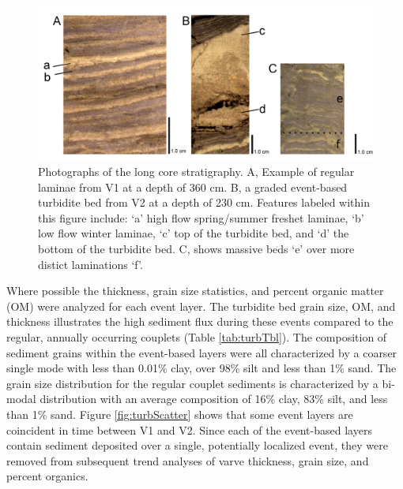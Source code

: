 \documentclass[Royal,times,doublespace,sageh]{sagej}
\begin{document}
\begin{figure}

{\centering \includegraphics[width=1\linewidth]{figs/good_vs_flood_vs_disturbed_varves_} 

}

\caption{Photographs of the long core stratigraphy. A, Example of regular laminae from V1 at a depth of 360 cm. B, a graded event-based turbidite bed from V2 at a depth of 230 cm. Features labeled within this figure include: ‘a’ high flow spring/summer freshet laminae, ‘b’ low flow winter laminae, ‘c’  top of the turbidite bed, and ‘d’ the bottom of the turbidite bed. C, shows massive beds ‘e’ over more distict laminations ‘f’.\label{tab:varve-turb}}\label{fig:varve-turb}
\end{figure}

Where possible the thickness, grain size statistics, and percent organic
matter (OM) were analyzed for each event layer. The turbidite bed grain
size, OM, and thickness illustrates the high sediment flux during these
events compared to the regular, annually occurring couplets (Table
\ref{tab:turbTbl}). The composition of sediment grains within the
event-based layers were all characterized by a coarser single mode with
less than 0.01\% clay, over 98\% silt and less than 1\% sand. The grain
size distribution for the regular couplet sediments is characterized by
a bi-modal distribution with an average composition of 16\% clay, 83\%
silt, and less than 1\% sand. Figure \ref{fig:turbScatter} shows that
some event layers are coincident in time between V1 and V2. Since each
of the event-based layers contain sediment deposited over a single,
potentially localized event, they were removed from subsequent trend
analyses of varve thickness, grain size, and percent organics.
\end{document}
